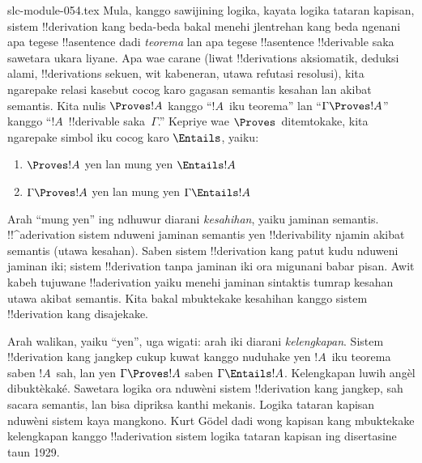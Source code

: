 \begin{filecontents*}[overwrite]{slc-module-054.tex}
Mula, kanggo sawijining logika, kayata logika tataran kapisan, sistem
!!{derivation} kang beda-beda bakal menehi jlentrehan kang beda ngenani
apa tegese !!a{sentence} dadi \emph{teorema} lan apa tegese
!!a{sentence} !!{derivable} saka sawetara ukara liyane. Apa wae
carane (liwat !!{derivation}s aksiomatik, deduksi alami,
!!{derivation}s sekuen, wit kabeneran, utawa refutasi resolusi), kita
ngarepake relasi kasebut cocog karo gagasan semantis kesahan lan
akibat semantis. Kita nulis $\Proves !A$ kanggo ``$!A$~iku teorema''
lan ``$\Gamma \Proves !A$'' kanggo ``$!A$~!!{derivable}
saka~$\Gamma$.'' Kepriye wae $\Proves$~ditemtokake, kita ngarepake
simbol iku cocog karo $\Entails$, yaiku:
\begin{enumerate}
\item $\Proves !A$ yen lan mung yen $\Entails !A$
\item $\Gamma \Proves !A$ yen lan mung yen $\Gamma \Entails !A$
\end{enumerate}
Arah ``mung yen'' ing ndhuwur diarani \emph{kesahihan}, yaiku jaminan
semantis. !!^a{derivation} sistem nduweni jaminan semantis yen
!!{derivability} njamin akibat semantis (utawa kesahan). Saben sistem
!!{derivation} kang patut kudu nduweni jaminan iki; sistem
!!{derivation} tanpa jaminan iki ora migunani babar pisan.
Awit kabeh tujuwane !!a{derivation} yaiku menehi jaminan sintaktis
tumrap kesahan utawa akibat semantis. Kita bakal mbuktekake kesahihan
kanggo sistem !!{derivation} kang disajekake.

Arah walikan, yaiku ``yen'', uga wigati: arah iki diarani
\emph{kelengkapan}. Sistem !!{derivation} kang jangkep cukup kuwat
kanggo nuduhake yen $!A$~iku teorema saben $!A$~sah, lan yen
$\Gamma \Proves !A$ saben $\Gamma \Entails !A$. Kelengkapan luwih angèl dibuktèkaké. Sawetara logika ora nduwèni sistem !!{derivation}
kang jangkep, sah sacara semantis, lan bisa dipriksa kanthi mekanis.
Logika tataran kapisan nduwèni sistem kaya mangkono.
Kurt G\"odel dadi wong kapisan
kang mbuktekake kelengkapan kanggo !!a{derivation} sistem logika
tataran kapisan ing disertasine taun 1929.


\end{filecontents*}
